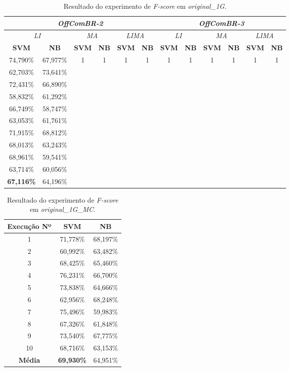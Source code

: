 \begin{table}[h]
    \centering
    \begin{tabular}{cccccccccccc}
        \hline 
        \multicolumn{6}{c}{\it OffComBR-2} & \multicolumn{6}{|c}{\it OffComBR-3} \\
        \hline
          \multicolumn{2}{c}{\it LI} 
        & \multicolumn{2}{|c}{\it MA}
        & \multicolumn{2}{|c}{\it LIMA} 
        & \multicolumn{2}{|c}{\it LI} 
        & \multicolumn{2}{|c}{\it MA}
        & \multicolumn{2}{|c}{\it LIMA} \\
        \hline
        {\bf SVM} & {\bf NB} & 
        {\bf SVM} & {\bf NB} & 
        {\bf SVM} & {\bf NB} &
        {\bf SVM} & {\bf NB} &
        {\bf SVM} & {\bf NB} &
        {\bf SVM} & {\bf NB} \\
        \hline
        74,790\% & 67,977\% & 1 & 1 & 1 & 1 & 1 & 1 & 1 & 1& 1 & 1 \\
        62,703\% & 73,641\% \\
        72,431\% & 66,890\% \\
        58,832\% & 61,292\% \\
        66,749\% & 58,747\% \\
        63,053\% & 61,761\% \\
        71,915\% & 68,812\% \\
        68,013\% & 63,243\% \\
        68,961\% & 59,541\% \\
        63,714\% & 60,056\% \\
        \hline
        {\bf 67,116\%} & 64,196\% \\
        \hline
    \end{tabular}
    \caption{Resultado do experimento de {\it F-score} em {\it original\_1G}.}
    \label{tab:resultados-li-ori-1g}
\end{table}

\begin{table}[h]
    \centering
    \begin{tabular}{c c c}
        \hline
        {\bf Execução Nº} & {\bf SVM} & {\bf NB} \\
        \hline
        1 & 71,778\% & 68,197\% \\
        2 & 60,992\% & 63,482\% \\
        3 & 68,425\% & 65,460\% \\
        4 & 76,231\% & 66,700\% \\
        5 & 73,838\% & 64,666\% \\
        6 & 62,956\% & 68,248\% \\
        7 & 75,496\% & 59,983\% \\
        8 & 67,326\% & 61,848\% \\
        9 & 73,540\% & 67,775\% \\
        10 & 68,716\% & 63,153\% \\
        \hline
        {\bf Média} & {\bf 69,930\%} & 64,951\% \\
        \hline
    \end{tabular}
    \caption{Resultado do experimento de {\it F-score} em {\it original\_1G\_MC}.}
    \label{tab:resultados-li-ori-1g-mc}
\end{table}

